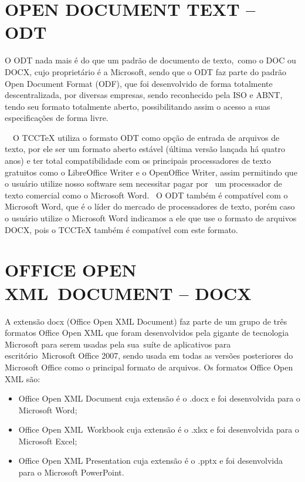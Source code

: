 \bigskip

\section[OPEN DOCUMENT TEXT {}-- ODT]{ OPEN DOCUMENT TEXT -- ODT}

\bigskip

{
O ODT nada mais \'e do que um padr\~ao de documento de texto,\ como o DOC ou DOCX, cujo propriet\'ario \'e a Microsoft,
sendo que o ODT faz parte do padr\~ao Open Document Format (ODF), que foi desenvolvido de forma totalmente
descentralizada, por diversas empresas, sendo reconhecido pela ISO e ABNT, tendo seu formato totalmente aberto,
possibilitando assim o acesso a suas especifica\c{c}\~oes de forma livre.}

{
\ \ O TCCTeX utiliza o formato ODT como op\c{c}\~ao de entrada de arquivos de texto, por ele ser um formato aberto
est\'avel (\'ultima vers\~ao lan\c{c}ada h\'a quatro anos) e ter total compatibilidade com os principais processadores
de texto gratuitos como o LibreOffice Writer e o OpenOffice Writer, assim permitindo que o usu\'ario utilize nosso
software sem necessitar pagar por \ um processador de texto comercial como o Microsoft Word. \ O ODT tamb\'em \'e
compat\'ivel com o Microsoft Word, que \'e o l\'ider do mercado de processadores de texto, por\'em caso o usu\'ario
utilize o Microsoft Word indicamos a ele que use o formato de arquivos DOCX, pois o TCCTeX tamb\'em \'e compat\'ivel
com este formato.}


\bigskip

\section[OFFICE OPEN XML\ DOCUMENT {}-- DOCX]{ OFFICE OPEN XML\ DOCUMENT -- DOCX}

\bigskip

{
A extens\~ao docx (Office Open XML Document) faz parte de um grupo de tr\^es formatos Office Open XML que foram
desenvolvidos pela gigante de tecnologia Microsoft para serem usadas pela sua\ su\'ite de aplicativos para
escrit\'orio\ Microsoft Office 2007, sendo usada em todas as vers\~oes posteriores do Microsoft Office como o principal
formato de arquivos. Os formatos Office Open XML s\~ao:}

\liststyleLFOvi
\begin{itemize}
\item {
Office Open XML Document cuja extens\~ao \'e o .docx e foi desenvolvida para o Microsoft Word;}
\item {
Office Open XML\ Workbook cuja extens\~ao \'e o .xlsx e foi desenvolvida para o Microsoft Excel;}
\item {
Office Open XML Presentation cuja extens\~ao \'e o .pptx e foi desenvolvida para o Microsoft PowerPoint.}
\end{itemize}

